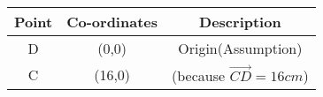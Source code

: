\begin{tabular}{|c|c|c|}
\hline
Point & Co-ordinates & Description\\
\hline
D & (0,0) & Origin(Assumption) \\
\hline
C & (16,0) & (because $\vec{CD} = 16cm$)\\
\hline
\end{tabular}
